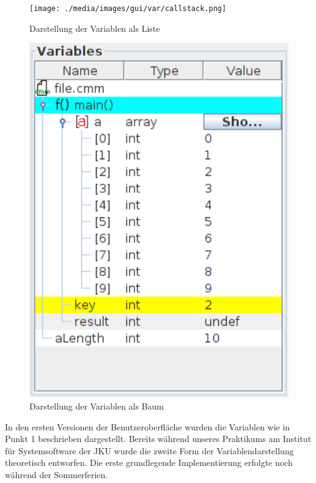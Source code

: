 \begin{figure}[h!]
\centering
	\begin{minipage}{0.50\textwidth}
		\centering
		\texttt{[image: ./media/images/gui/var/callstack.png]}
		\caption{Darstellung der Variablen als Liste}\label{fig:deb-var-m1}
	\end{minipage}\hfill
	\begin{minipage}{0.444\textwidth}
		\centering
		\includegraphics[width=1.0\textwidth]{./media/images/gui/var/treetable2.png}
		\caption{Darstellung der Variablen als Baum}\label{fig:deb-var-m2}
	\end{minipage}
\end{figure}

In den ersten Versionen der Benutzeroberfläche wurden die Variablen wie in Punkt 1 beschrieben dargestellt. Bereits während unseres Praktikums am Institut für Systemsoftware der JKU wurde die zweite Form der Variablendarstellung theoretisch entworfen. Die erste grundlegende Implementierung erfolgte noch während der Sommerferien.

